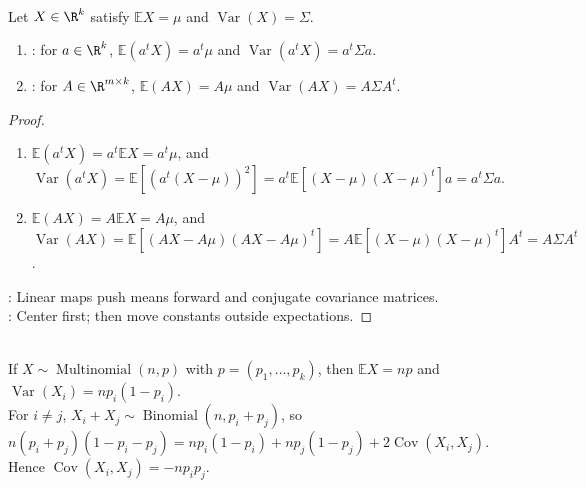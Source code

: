 \begin{proposition} \label{prop:linear-transform-random-vector-moments} \\
Let $X\in\R^k$ satisfy $\mathbb{E}X=\mu$ and $\operatorname{Var}(X)=\Sigma$.
\begin{enumerate}[label=\roman*.]
\setlength{\itemsep}{0pt}
\item {}: for $a\in\R^k$, $\mathbb{E}(a^tX)=a^t\mu$ and $\operatorname{Var}(a^tX)=a^t\Sigma a$.
\item {}: for $A\in\R^{m\times k}$, $\mathbb{E}(AX)=A\mu$ and $\operatorname{Var}(AX)=A\Sigma A^t$.
\end{enumerate}
\begin{proof}
\begin{enumerate}[label=\roman*.]
\setlength{\itemsep}{0pt}
\item $\mathbb{E}(a^tX)=a^t\mathbb{E}X=a^t\mu$, and $\operatorname{Var}(a^tX)=\mathbb{E}[(a^t(X-\mu))^2]=a^t\mathbb{E}[(X-\mu)(X-\mu)^t]a=a^t\Sigma a$.
\item $\mathbb{E}(AX)=A\mathbb{E}X=A\mu$, and $\operatorname{Var}(AX)=\mathbb{E}[(AX-A\mu)(AX-A\mu)^t]=A\mathbb{E}[(X-\mu)(X-\mu)^t]A^t=A\Sigma A^t$.
\end{enumerate}
: Linear maps push means forward and conjugate covariance matrices.\\
: Center first; then move constants outside expectations.
\end{proof}
\end{proposition}

\begin{example} \label{ex:multinomial-covariance-matrix} \\
If $X\sim\operatorname{Multinomial}(n,p)$ with $p=(p_1,\ldots,p_k)$, then $\mathbb{E}X=np$ and $\operatorname{Var}(X_i)=np_i(1-p_i)$.\\
For $i\neq j$, $X_i+X_j\sim\operatorname{Binomial}(n,p_i+p_j)$, so $n(p_i+p_j)(1-p_i-p_j)=np_i(1-p_i)+np_j(1-p_j)+2\operatorname{Cov}(X_i,X_j)$.\\
Hence $\operatorname{Cov}(X_i,X_j)=-np_ip_j$.
\end{example}

